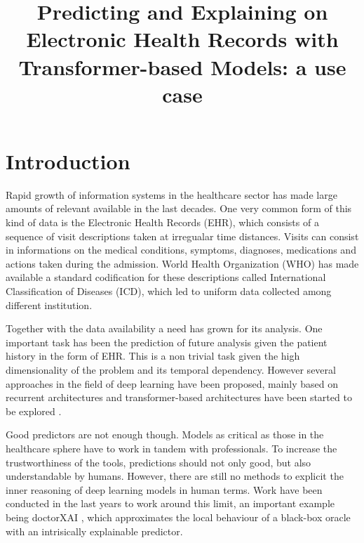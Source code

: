 \documentclass[]{marticle}
\title{\textbf{\huge Predicting and Explaining on Electronic Health Records  with Transformer-based Models: a use case}}
\date{}
\begin{document}
\maketitle
\newpage

\section{Introduction}

Rapid growth of information systems in the healthcare sector has made large amounts of relevant
available in the last decades. One very common form of this kind of data is the Electronic Health
Records (EHR), which consists of a sequence of visit descriptions taken at irregualar time
distances. Visits can consist in informations on the medical conditions, symptoms, diagnoses,
medications and actions taken during the admission. World Health Organization (WHO) has made
available a standard codification for these descriptions called International Classification of
Diseases (ICD), which led to uniform data collected among different institution.

Together with the data availability a need has grown for its analysis. One important task has been
the prediction of future analysis given the patient history in the form of EHR. This is a non
trivial task given the high dimensionality of the problem and its temporal dependency. However
several approaches in the field of deep learning have been proposed, mainly based on recurrent
architectures  and transformer-based architectures have been started to be explored
.

Good predictors are not enough though. Models as critical as those in the healthcare sphere have to
work in tandem with professionals. To increase the trustworthiness of the tools, predictions should
not only good, but also understandable by humans. However, there are still no methods to explicit
the inner reasoning of deep learning models in human terms. Work have been conducted in the last
years to work around this limit, an important example being doctorXAI \cite{panigutti-xai}, which
approximates the local behaviour of a black-box oracle with an intrisically explainable predictor.
\end{document}
